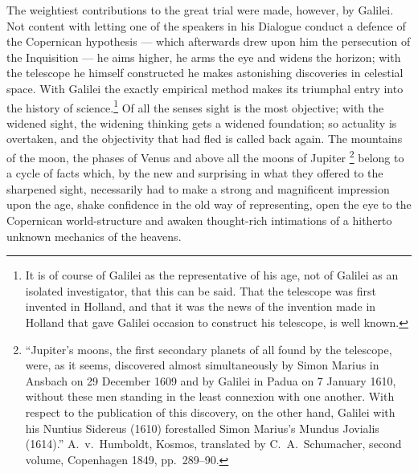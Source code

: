 \documentclass[12pt,a4paper]{book}
\renewcommand{\thefootnote}{*)}
\begin{document}
The weightiest contributions to the great trial were made, however, by Galilei. Not content with letting one
of the speakers in his Dialogue%
\renewcommand{\thefootnote}{**)}%
\footnotemark%
\renewcommand{\thefootnote}{***)}%
%
\renewcommand{\thefootnote}{*)}
conduct a defence of the Copernican hypothesis --- which afterwards drew upon him the persecution of the
Inquisition --- he aims higher, he arms the eye and widens the horizon; with the telescope he himself
constructed he makes astonishing discoveries in celestial space. With Galilei the exactly empirical method
makes its triumphal entry into the history of
science.\footnote{%
It is of course of Galilei as the representative of his age, not of Galilei as an isolated investigator, that
this can be said. That the telescope was first invented in Holland, and that it was the news of the invention
made in Holland that gave Galilei occasion to construct his telescope, is well known.} Of all the senses sight
is the most objective; with the widened sight, the widening thinking gets a widened foundation; so actuality
is overtaken, and the objectivity that had fled is called back again. The mountains of the moon, the phases of
Venus and above all the moons of Jupiter%
\renewcommand{\thefootnote}{**)}%
\footnote{%
``Jupiter's moons, the first secondary planets of all found by the telescope, were, as it seems, discovered
almost simultaneously by Simon Marius in Ansbach on 29 December 1609 and by Galilei in Padua on 7 January
1610, without these men standing in the least connexion with one another. With respect to the publication of
this discovery, on the other hand, Galilei with his Nuntius Sidereus (1610) forestalled Simon Marius's Mundus
Jovialis (1614).'' A.\ v.\ Humboldt, Kosmos, translated by C.\ A.\ Schumacher, second volume, Copenhagen 1849,
pp.\ 289--90.}%
\renewcommand{\thefootnote}{*)}
belong to a cycle of facts which, by the new and surprising in what they offered to the sharpened sight,
necessarily had to make a strong and magnificent impression upon the age, shake confidence in the old way of
representing, open the eye to the Copernican world-structure and awaken thought-rich intimations of a
hitherto unknown mechanics of the heavens.
\end{document}
